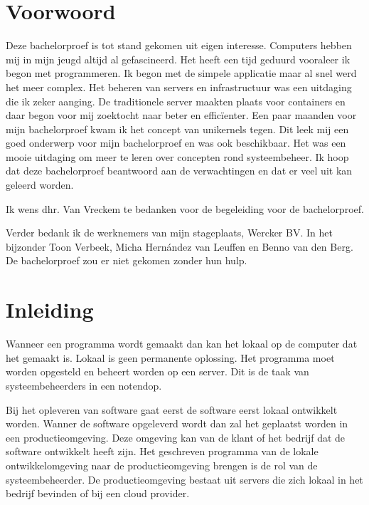 \documentclass[pdftex,a4paper,12pt,twoside]{report}
\begin{document}
\begin{abstract}
\end{abstract}

\chapter*{Voorwoord}
\label{ch:voorwoord}

Deze bachelorproef is tot stand gekomen uit eigen interesse. Computers hebben mij in mijn jeugd altijd al gefascineerd. Het heeft een tijd geduurd vooraleer ik begon met programmeren. Ik begon met de simpele applicatie maar al snel werd het meer complex.  Het beheren van servers en infrastructuur was een uitdaging die ik zeker aanging. De traditionele server maakten plaats voor containers en daar begon voor mij zoektocht naar beter en efficïenter. Een paar maanden voor mijn bachelorproef kwam ik het concept van unikernels tegen. Dit leek mij een goed onderwerp voor mijn bachelorproef en was ook beschikbaar. Het was een mooie uitdaging om meer te leren over concepten rond systeembeheer. Ik hoop dat deze bachelorproef beantwoord aan de verwachtingen en dat er veel uit kan geleerd worden.

Ik wens dhr. Van Vreckem te bedanken voor de begeleiding voor de bachelorproef.

Verder bedank ik de werknemers van mijn stageplaats, Wercker BV. In het bijzonder Toon Verbeek, Micha Hernández van Leuffen en Benno van den Berg. De bachelorproef zou er niet gekomen zonder hun hulp.

\tableofcontents

\chapter{Inleiding}
\label{ch:inleiding}

Wanneer een programma wordt gemaakt dan kan het lokaal op de computer dat het gemaakt is. Lokaal is geen permanente oplossing. Het programma moet worden opgesteld en beheert worden op een server. Dit is de taak van systeembeheerders in een notendop.

Bij het opleveren van software gaat eerst de software eerst lokaal ontwikkelt worden. Wanner de software opgeleverd wordt dan zal het geplaatst worden in een productieomgeving. Deze omgeving kan van de klant of het bedrijf dat de software ontwikkelt heeft zijn. Het geschreven programma van de lokale ontwikkelomgeving naar de productieomgeving brengen is de rol van de systeembeheerder. De productieomgeving bestaat uit servers die zich lokaal in het bedrijf bevinden of bij een cloud provider.
\end{document}
